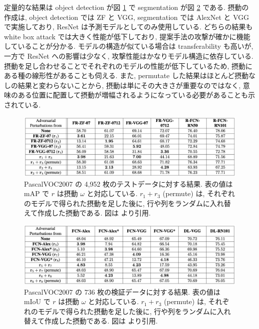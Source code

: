 定量的な結果は object detection が図 \ref{fig:adversarial-examples-result-object-detection} で segmentation が図 \ref{fig:adversarial-examples-result-segmentation} である.
摂動の作成は, object detection では ZF と VGG, segmentation では AlexNet と VGG で実施しており, ResNet は予測モデルとしてのみ使用している.
どちらの結果も white box attack では大きく性能が低下しており, 提案手法の攻撃が確かに機能していることが分かる.
モデルの構造が似ている場合は transferability も高いが, 一方で ResNet への影響は少なく, 攻撃性能はかなりモデル構造に依存している.
摂動を足し合わせることでそれぞれのモデルの性能が低下しているため, 摂動にある種の線形性があることも伺える.
また, permutate した結果はほとんど摂動なしの結果と変わらないことから, 摂動は単にその大きさが重要なのではなく, 意味のある位置に配置して摂動が増幅されるようになっている必要があることも示されている.
%
\begin{figure}[htbp]
\begin{center}
\includegraphics[width=14.0cm]{figures/adversarial-examples-result-object-detection.pdf}
\end{center}
\caption{
PascalVOC2007 の 4,952 枚のテストデータに対する結果.
表の値は mAP で $r$ は摂動 $\omega$ と対応している.
$r_1 + r_3$ (permute) は, それぞれのモデルで得られた摂動を足した後に, 行や列をランダムに入れ替えて作成した摂動である.
図は \cite{xie2017adversarial} より引用.
}
\label{fig:adversarial-examples-result-object-detection}
\end{figure}
%
%
\begin{figure}[htbp]
\begin{center}
\includegraphics[width=14.0cm]{figures/adversarial-examples-result-segmentation.pdf}
\end{center}
\caption{
PascalVOC2007 の 736 枚の検証データに対する結果.
表の値は mIoU で $r$ は摂動 $\omega$ と対応している.
$r_1 + r_3$ (permute) は, それぞれのモデルで得られた摂動を足した後に, 行や列をランダムに入れ替えて作成した摂動である.
図は \cite{xie2017adversarial} より引用.
}
\label{fig:adversarial-examples-result-segmentation}
\end{figure}
%

